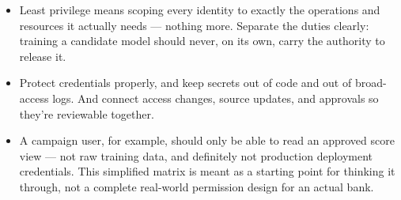 \documentclass[11pt,a4paper]{article}
\begin{document}
\begin{examplebox}[title after break={SPOKEN SCRIPT --- slide 42 continued}]
\begin{itemize}
\item Least privilege means scoping every identity to exactly the operations and resources it actually needs — nothing more. Separate the duties clearly: training a candidate model should never, on its own, carry the authority to release it.
\item Protect credentials properly, and keep secrets out of code and out of broad-access logs. And connect access changes, source updates, and approvals so they're reviewable together.
\item A campaign user, for example, should only be able to read an approved score view — not raw training data, and definitely not production deployment credentials. This simplified matrix is meant as a starting point for thinking it through, not a complete real-world permission design for an actual bank.
\end{itemize}
\end{examplebox}
\par\noindent{\scriptsize\textcolor{teal!60!black}{Reading anchor: Bass, Ch. 9–10 / §14.2 · Proposed permissions}}
\clearpage
\end{document}
